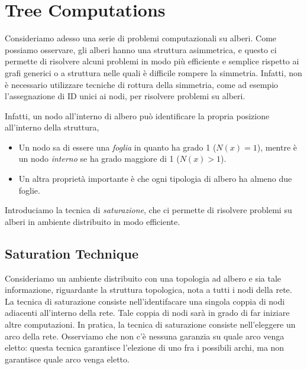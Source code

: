 \chapter{Tree Computations}

Consideriamo adesso una serie di problemi computazionali su alberi. Come possiamo osservare, gli alberi hanno una struttura asimmetrica, e questo ci permette di risolvere alcuni problemi in modo più efficiente e semplice rispetto ai grafi generici o a struttura nelle quali è difficile rompere la simmetria. Infatti, non è necessario utilizzare tecniche di rottura della simmetria, come ad esempio l'assegnazione di ID unici ai nodi, per risolvere problemi su alberi.

Infatti, un nodo all'interno di albero può identificare la propria posizione all'interno della struttura,
\begin{itemize}
    \item Un nodo sa di essere una \textit{foglia} in quanto ha grado 1 ($N(x) = 1$), mentre è un nodo \textit{interno} se ha grado maggiore di 1 ($N(x) > 1$).
        \item Un altra proprietà importante è che ogni tipologia di albero ha almeno due foglie.
        \usetikzlibrary{chains}
        \begin{center}
        \end{center}
\end{itemize}

Introduciamo la tecnica di \textit{saturazione}, che ci permette di risolvere problemi su alberi in ambiente distribuito in modo efficiente.

\section{Saturation Technique}

Consideriamo un ambiente distribuito con una topologia ad albero e sia tale informazione, riguardante la struttura topologica, nota a tutti i nodi della rete. La tecnica di saturazione consiste nell'identifacare una singola coppia di nodi adiacenti all'interno della rete. Tale coppia di nodi sarà in grado di far iniziare altre computazioni. In pratica, la tecnica di saturazione consiste nell'eleggere un arco della rete. Osserviamo che non c'è nessuna garanzia su quale arco venga eletto: questa tecnica garantisce l'elezione di uno fra i possibili archi, ma non garantisce quale arco venga eletto.

